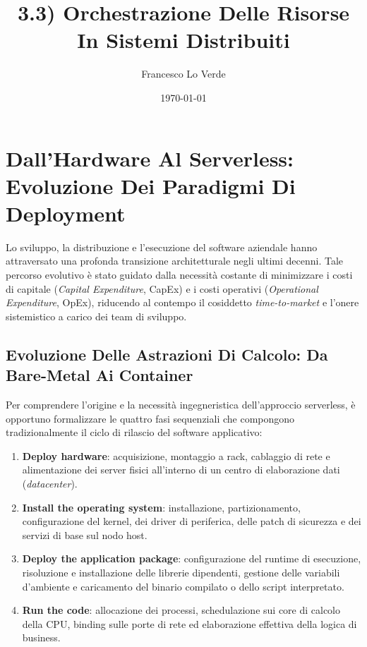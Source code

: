 \documentclass[11pt, a4paper]{article}
\title{3.3) Orchestrazione Delle Risorse In Sistemi Distribuiti}
\date{\today}
\author{Francesco Lo Verde}
\begin{document}
\maketitle


\section{Dall'Hardware Al Serverless: Evoluzione Dei Paradigmi Di Deployment}

Lo sviluppo, la distribuzione e l'esecuzione del software aziendale hanno attraversato una profonda transizione architetturale negli ultimi decenni. Tale percorso evolutivo è stato guidato dalla necessità costante di minimizzare i costi di capitale (\emph{Capital Expenditure}, CapEx) e i costi operativi (\emph{Operational Expenditure}, OpEx), riducendo al contempo il cosiddetto \emph{time-to-market} e l'onere sistemistico a carico dei team di sviluppo.

\subsection{Evoluzione Delle Astrazioni Di Calcolo: Da Bare-Metal Ai Container}

Per comprendere l'origine e la necessità ingegneristica dell'approccio serverless, è opportuno formalizzare le quattro fasi sequenziali che compongono tradizionalmente il ciclo di rilascio del software applicativo:
\begin{enumerate}[noitemsep]
    \item \textbf{Deploy hardware}: acquisizione, montaggio a rack, cablaggio di rete e alimentazione dei server fisici all'interno di un centro di elaborazione dati (\emph{datacenter}).
    \item \textbf{Install the operating system}: installazione, partizionamento, configurazione del kernel, dei driver di periferica, delle patch di sicurezza e dei servizi di base sul nodo host.
    \item \textbf{Deploy the application package}: configurazione del runtime di esecuzione, risoluzione e installazione delle librerie dipendenti, gestione delle variabili d'ambiente e caricamento del binario compilato o dello script interpretato.
    \item \textbf{Run the code}: allocazione dei processi, schedulazione sui core di calcolo della CPU, binding sulle porte di rete ed elaborazione effettiva della logica di business.
\end{enumerate}
\end{document}
